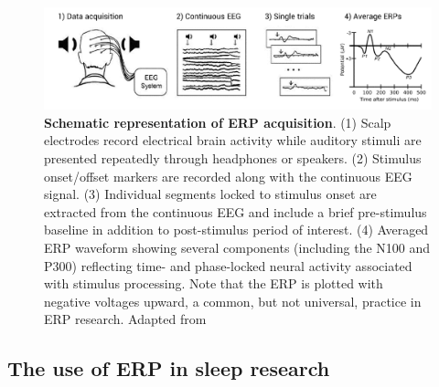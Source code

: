 \begin{figure}[htb]
	\includegraphics[width=\textwidth]{Fig/Methods/ERP/ERP.png}
	\caption[Schematic representation of ERP acquisition]{\textbf{Schematic representation of ERP acquisition}. (1) Scalp electrodes record electrical brain activity while auditory stimuli are presented repeatedly through headphones or speakers. (2) Stimulus onset/offset markers are recorded along with the continuous EEG signal. (3) Individual segments locked to stimulus onset are extracted from the continuous EEG and include a brief pre-stimulus baseline in addition to post-stimulus period of interest. (4) Averaged ERP waveform showing several components (including the N100 and P300) reflecting time- and phase-locked neural activity associated with stimulus processing. Note that the ERP is plotted with negative voltages upward, a common, but not universal, practice in ERP research. Adapted from \citet{key_human_2016}}
	\label{fig:methods:erp}
\end{figure}

\subsection{The use of ERP in sleep research}
\label{sec:eeg:erp:erp}

